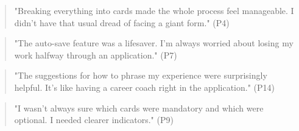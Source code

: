 \documentclass[
	letterpaper, %
]{jdf}
\begin{document}
\begin{quote}
"Breaking everything into cards made the whole process feel manageable. I didn't have that usual dread of facing a giant form." (P4)
\end{quote}

\begin{quote}
"The auto-save feature was a lifesaver. I'm always worried about losing my work halfway through an application." (P7)
\end{quote}

\begin{quote}
"The suggestions for how to phrase my experience were surprisingly helpful. It's like having a career coach right in the application." (P14)
\end{quote}

\begin{quote}
"I wasn't always sure which cards were mandatory and which were optional. I needed clearer indicators." (P9)
\end{quote}
\end{document}
